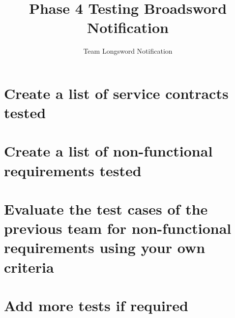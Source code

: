 \documentclass[11pt]{article}
\author{Team Longsword Notification}
\title{Phase 4 Testing Broadsword Notification}
\begin{document}
	\setlength{\parskip}{6pt}
	
	
	
	\tableofcontents
	
	\newpage
	
	
	\section{Create a list of service contracts tested}
	\section{Create a list of non-functional requirements tested}
	\section{Evaluate the test cases of the previous team for non-functional requirements using your own criteria}	
	\section{Add more tests if required}


	
	
\end{document}
